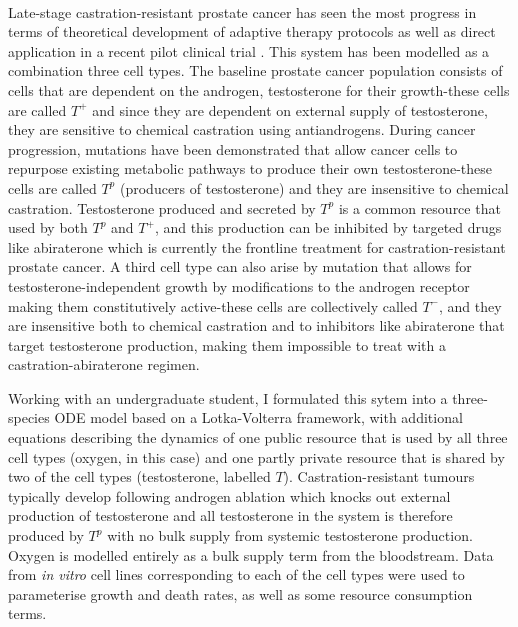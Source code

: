 \documentclass[12pt,onecolumn,twoside]{article}
\begin{document}
	\paragraph{\empty}Late-stage castration-resistant prostate cancer has seen the most progress in terms of theoretical development of adaptive therapy protocols \citep{Cunningham2018, West2018b, Jain2011} as well as direct application in a recent pilot clinical trial \citep{Zhang2017a}. This system has been modelled as a combination three cell types. The baseline prostate cancer population consists of cells that are dependent on the androgen, testosterone for their growth-these cells are called $T^+$ and since they are dependent on external supply of testosterone, they are sensitive to chemical castration using antiandrogens. During cancer progression, mutations have been demonstrated that allow cancer cells to repurpose existing metabolic pathways to produce their own testosterone-these cells are called $T^p$ (producers of testosterone) and they are insensitive to chemical castration. Testosterone produced and secreted by $T^p$ is a common resource that used by both $T^p$ and $T^+$, and this production can be inhibited by targeted drugs like abiraterone which is currently the frontline treatment for castration-resistant prostate cancer. A third cell type can also arise by mutation that allows for testosterone-independent growth by modifications to the androgen receptor making them constitutively active-these cells are collectively called $T^-$, and they are insensitive both to chemical castration and to inhibitors like abiraterone that target testosterone production, making them impossible to treat with a castration-abiraterone regimen.

	Working with an undergraduate student, I formulated this sytem into a three-species ODE model based on a Lotka-Volterra framework, with additional equations describing the dynamics of one public resource that is used by all three cell types (oxygen, in this case) and one partly private resource that is shared by two of the cell types (testosterone, labelled $T$). Castration-resistant tumours typically develop following androgen ablation which knocks out external production of testosterone and all testosterone in the system is therefore produced by $T^p$ with no bulk supply from systemic testosterone production. Oxygen is modelled entirely as a bulk supply term from the bloodstream. Data from \textit{in vitro} cell lines corresponding to each of the cell types were used to parameterise growth and death rates, as well as some resource consumption terms.\\
\end{document}
